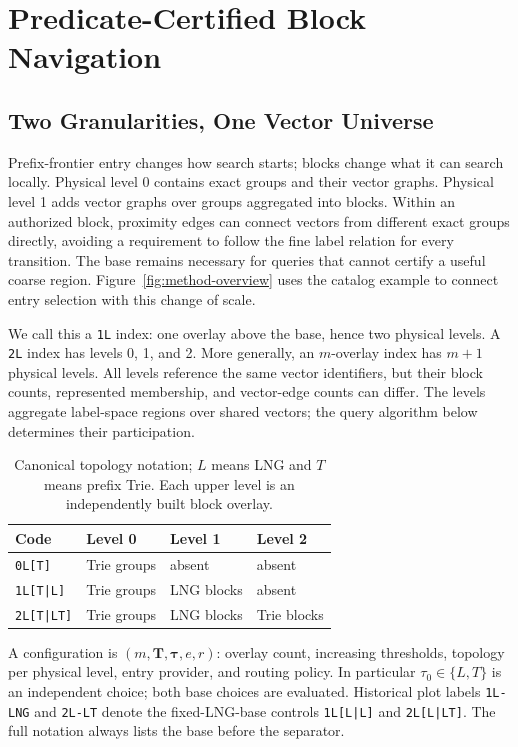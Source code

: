 \section{Predicate-Certified Block Navigation}
\label{sec:index}
\subsection{Two Granularities, One Vector Universe}
Prefix-frontier entry changes how search starts; blocks change what it can
search locally.  Physical level 0 contains exact groups and their vector
graphs.  Physical level 1 adds vector graphs over groups aggregated into
blocks.  Within an authorized block, proximity edges can connect vectors
from different exact groups directly, avoiding a requirement to follow the
fine label relation for every transition.  The base remains necessary for
queries that cannot certify a useful coarse region. Figure~\ref{fig:method-overview}
uses the catalog example to connect entry selection with this change of scale.

We call this a \texttt{1L} index: one overlay above the base, hence two
physical levels.  A \texttt{2L} index has levels 0, 1, and 2.  More generally,
an $m$-overlay index has $m+1$ physical levels.  All levels reference the same
vector identifiers, but their block counts, represented membership, and
vector-edge counts can differ.  The levels aggregate label-space regions over shared vectors; the query
algorithm below determines their participation.

\begin{table}[t]
\centering\small
\caption{Canonical topology notation; $L$ means LNG and $T$ means prefix
Trie. Each upper level is an independently built block overlay.}
\label{tab:level-notation}
\begin{tabular}{llll}
\toprule
Code & Level 0 & Level 1 & Level 2\\
\midrule
\texttt{0L[T]} & Trie groups & absent & absent\\
\texttt{1L[T|L]} & Trie groups & LNG blocks & absent\\
\texttt{2L[T|LT]} & Trie groups & LNG blocks & Trie blocks\\
\bottomrule
\end{tabular}
\end{table}

A configuration is $(m,\mathbf{T},\boldsymbol{\tau},e,r)$: overlay count,
increasing thresholds, topology per physical level, entry provider, and
routing policy.  In particular $\tau_0\in\{L,T\}$ is an independent choice;
both base choices are evaluated.  Historical plot labels
\texttt{1L-LNG} and \texttt{2L-LT} denote the fixed-LNG-base controls
\texttt{1L[L|L]} and \texttt{2L[L|LT]}.  The full notation always lists the
base before the separator.

